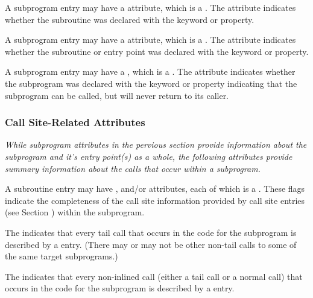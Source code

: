 A 
\hypertarget{chap:DWATpurepurepropertyofasubroutine}{}
subprogram entry may have 
a 
\DWATpureDEFN{} attribute, which is
a . 
The attribute indicates whether the subroutine was
declared with the  keyword or property.

A 
\hypertarget{chap:DWATrecursiverecursivepropertyofasubroutine}{}
subprogram entry may have a 
\DWATrecursiveDEFN{} attribute, which
is a . 
The attribute indicates whether the subroutine
or entry point was declared with the  keyword
or property.

A subprogram entry may have a 
\DWATnoreturnDEFN{}
, 
which is a \CLASSflag. The attribute 
indicates whether the subprogram was declared with the  keyword or property 
indicating that the subprogram can be called, but will never return to its caller.

\subsubsection{Call Site-Related Attributes}
\textit{While subprogram attributes in the pervious section provide
information about the subprogram and it's entry point(s) as a whole,
the following attributes provide summary information about the calls
that occur within a subprogram.}

A subroutine entry may have \DWATcallalltailcallsNAME, 
\DWATcallallcallsNAME{} and/or \DWATcallallsourcecallsNAME{} 
attributes, each of which is a 
.
These flags indicate the completeness of the call site 
information provided by call site entries (see 
Section ) within the subprogram.

The \DWATcallalltailcallsDEFN{}
indicates that every tail call 
that occurs in the code for the subprogram is described by a 
\DWTAGcallsite{} entry. 
(There may or may not be other non-tail calls to some of the same 
target subprograms.)

The \DWATcallallcallsDEFN{}
indicates that every non-inlined call
(either a tail call or a normal call) that occurs in the code for the subprogram
is described by a \DWTAGcallsite{} entry.

